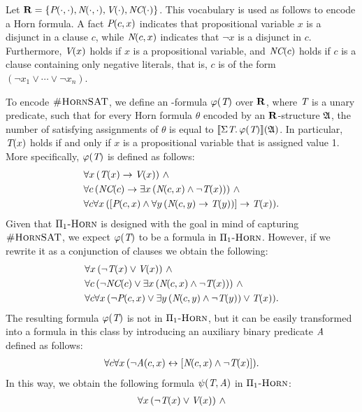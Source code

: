 \begin{example}
Let $\mathbf{R} = \{\textit{P}(\cdot,\cdot), \textit{N}(\cdot,\cdot), \textit{V}(\cdot), \textit{NC}(\cdot)\}$. This vocabulary is used as follows to encode a Horn formula. A fact $\textit{P}(c,x)$ indicates that propositional variable $x$ is a disjunct in a clause $c$, while $\textit{N}(c,x)$ indicates that $\neg x$ is a disjunct in $c$. Furthermore, $\textit{V}(x)$ holds if  $x$ is a propositional variable, and $\textit{NC}(c)$ holds if $c$ is a clause containing only negative literals, that is, $c$ is of the form $(\neg x_1 \vee \cdots \vee \neg x_n)$.

To encode $\textsc{\#HornSAT}$, we define an \so-formula $\varphi(\textit{T})$ over $\mathbf{R}$, where $\textit{T}$ is a unary predicate, such that for every Horn formula $\theta$ encoded by an $\mathbf{R}$-structure $\mathfrak{A}$, the number of satisfying assignments of $\theta$ is equal to ${\llbracket{}{\Sigma{\textit{T}}.\, \varphi(\textit{T})}\rrbracket}(\mathfrak{A})$. In particular, $\textit{T}(x)$ holds if and only if $x$ is a propositional variable that is assigned value 1.  More specifically, $\varphi(\textit{T})$ is defined as follows:
\begin{align*}
&\forall x \, (\textit{T}(x) \to \textit{V}(x)) \ \wedge\\
&\forall c \, (\textit{NC}(c) \to \exists x \, (\textit{N}(c,x) \wedge \neg \textit{T}(x))) \ \wedge\\
&\forall c \forall x \, ([\textit{P}(c,x) \wedge \forall y \, (\textit{N}(c,y) \to \textit{T}(y))] \to \textit{T}(x)).
\end{align*}
Given that $\Pi_1\textsc{-Horn}$ is designed with the goal in mind of capturing $\textsc{\#HornSAT}$, we expect $\varphi(\textit{T})$ to be a formula in $\Pi_1\textsc{-Horn}$. However, if we rewrite it as a conjunction of clauses we obtain the following:
\begin{align*}
&\forall x \, (\neg \textit{T}(x) \vee \textit{V}(x)) \ \wedge\\
&\forall c \, (\neg \textit{NC}(c) \vee \exists x \, (\textit{N}(c,x) \wedge \neg \textit{T}(x)))\ \wedge\\
&\forall c \forall x \, (\neg \textit{P}(c,x) \vee \exists y \, (\textit{N}(c,y) \wedge \neg \textit{T}(y)) \vee \textit{T}(x)).
\end{align*}
The resulting formula $\varphi(\textit{T})$ is not in $\Pi_1\textsc{-Horn}$, but it can be easily transformed into a formula in this class  by introducing an auxiliary binary predicate $\textit{A}$ defined as follows:
\begin{align*}
\forall c \forall x \, (\neg \textit{A}(c,x) \leftrightarrow [\textit{N}(c,x) \wedge \neg \textit{T}(x)]).
\end{align*}
In this way, we obtain the following formula $\psi(\textit{T},\textit{A})$ in $\Pi_1\textsc{-Horn}$:
\begin{align*}
&\forall x \, (\neg \pT(x) \vee \pV(x)) \ \wedge\\

\end{align*}
\end{example}
